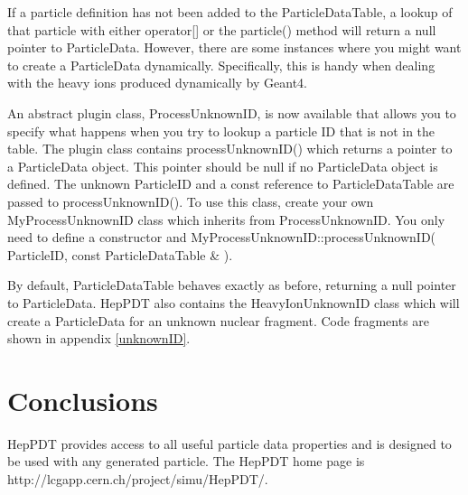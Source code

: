 If a particle definition has not been added to the ParticleDataTable,
a lookup of that particle with either operator[] or the particle() method
will return a null pointer to ParticleData.   However, there are some instances
where you might want to create a ParticleData dynamically.  Specifically,
this is handy when dealing with the heavy ions produced dynamically by
Geant4.

An abstract plugin class, ProcessUnknownID, is now available that allows you
to specify what happens when you try to lookup a particle ID that is not
in the table.  The plugin class contains processUnknownID() which returns
a pointer to a ParticleData object.  
This pointer should be null if no ParticleData object is defined.
The unknown ParticleID and a const reference to ParticleDataTable are 
passed to processUnknownID().
To use this class, create your own MyProcessUnknownID class
which inherits from ProcessUnknownID.  
You only need to define a constructor and 
MyProcessUnknownID::processUnknownID( ParticleID,  const ParticleDataTable \& ).

By default, ParticleDataTable behaves exactly as before, 
returning a null pointer to ParticleData.  HepPDT also contains the
HeavyIonUnknownID class which will create a ParticleData for an unknown
nuclear fragment.  Code fragments are shown in appendix \ref{unknownID}.

\section{Conclusions}

HepPDT provides access to all useful particle data properties
and is designed to be used with any generated particle.    
The HepPDT home page is http://lcgapp.cern.ch/project/simu/HepPDT/.
